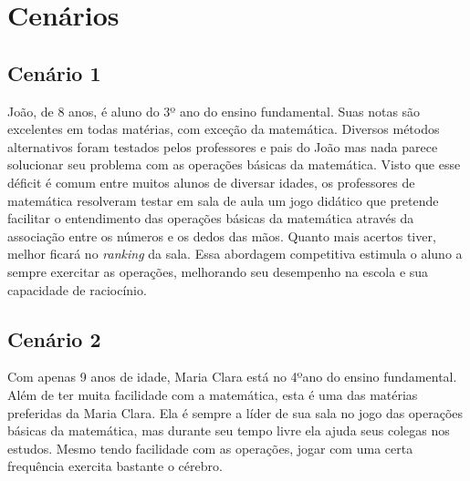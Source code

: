 \documentclass[
    12pt,               %
    openany,          	%
    twoside,            %
    a4paper,            %
    brazil              %
    ]{abntex2}
\begin{document}
\chapter{Cenários}

\section{Cenário 1}
João, de 8 anos, é aluno do 3º ano do ensino fundamental. Suas notas são
excelentes em todas matérias, com exceção da matemática. Diversos métodos
alternativos foram testados pelos professores e pais do João mas nada parece
solucionar seu problema com as operações básicas da matemática. Visto que esse
déficit é comum entre muitos alunos de diversar idades, os professores de
matemática resolveram testar em sala de aula um jogo didático que pretende
facilitar o entendimento das operações básicas da matemática através da
associação entre os números e os dedos das mãos. Quanto mais acertos tiver,
melhor ficará no \textit{ranking} da sala. Essa abordagem competitiva estimula
o aluno a sempre exercitar as operações, melhorando seu desempenho na escola e
sua capacidade de raciocínio.

\section{Cenário 2}
Com apenas 9 anos de idade, Maria Clara está no 4ºano do ensino fundamental. Além
de ter muita facilidade com a matemática, esta é uma das matérias preferidas da
Maria Clara. Ela é sempre a líder de sua sala no jogo das operações básicas da
matemática, mas durante seu tempo livre ela ajuda seus colegas nos estudos.
Mesmo tendo facilidade com as operações, jogar com uma certa frequência
exercita bastante o cérebro.
\end{document}
